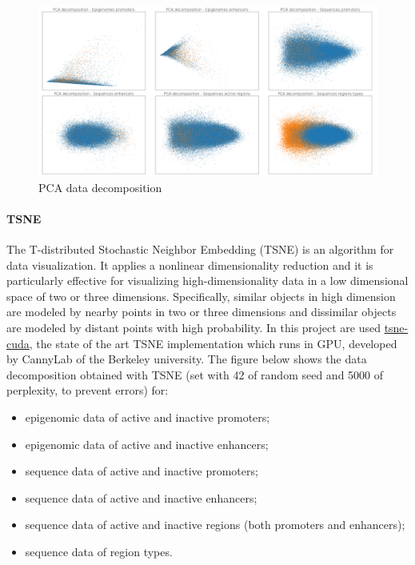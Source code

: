 \begin{figure}[h]
\centering
\includegraphics[width=0.95\linewidth]{../images/plot_pca.png}
\caption{PCA data decomposition}
\end{figure}

\paragraph{TSNE}

The T-distributed Stochastic Neighbor Embedding (TSNE) is an algorithm
for data visualization. It applies a nonlinear dimensionality reduction
and it is particularly effective for visualizing high-dimensionality
data in a low dimensional space of two or three dimensions.
Specifically, similar objects in high dimension are modeled by nearby
points in two or three dimensions and dissimilar objects are modeled by
distant points with high probability. In this project are used
\href{https://github.com/CannyLab/tsne-cuda}{tsne-cuda}, the state of
the art TSNE implementation which runs in GPU, developed by CannyLab of
the Berkeley university. The figure below shows the data decomposition
obtained with TSNE (set with 42 of random seed and 5000 of perplexity,
to prevent errors) for:

\begin{itemize}
\item
  epigenomic data of active and inactive promoters;
\item
  epigenomic data of active and inactive enhancers;
\item
  sequence data of active and inactive promoters;
\item
  sequence data of active and inactive enhancers;
\item
  sequence data of active and inactive regions (both promoters and
  enhancers);
\item
  sequence data of region types.
\end{itemize}

